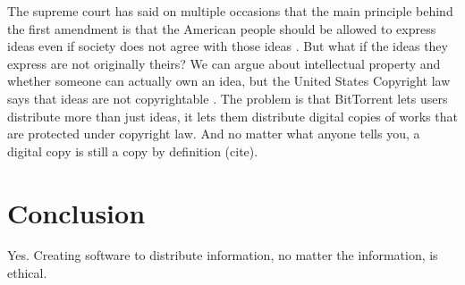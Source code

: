 \documentclass[11pt]{article}
\begin{document}
The supreme court has said on multiple occasions that the main principle behind the first amendment is that the American people should be allowed to express ideas even if society does not agree with those ideas \cite[51]{1988hustler}. But what if the ideas they express are not originally theirs? We can argue about intellectual property and whether someone can actually own an idea, but the United States Copyright law says that ideas are not copyrightable \cite{t17c1s103}. The problem is that BitTorrent lets users distribute more than just ideas, it lets them distribute digital copies of works that are protected under copyright law. And no matter what anyone tells you, a digital copy is still a copy by definition (cite).

\section{Conclusion}
Yes. Creating software to distribute information, no matter the information, is ethical.

\newpage
\singlespacing


\end{document}
